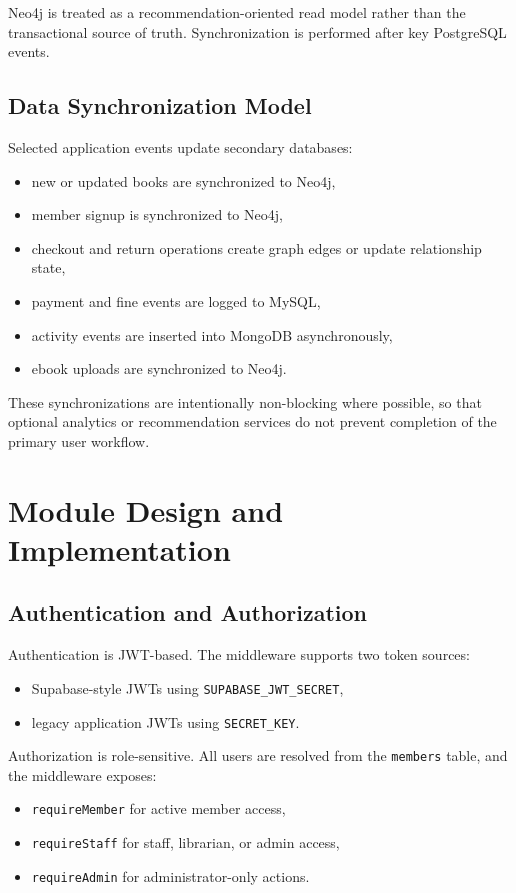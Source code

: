 \documentclass[12pt,a4paper]{report}
\begin{document}
Neo4j is treated as a recommendation-oriented read model rather than the transactional source of truth. Synchronization is performed after key PostgreSQL events.

\section{Data Synchronization Model}
Selected application events update secondary databases:
\begin{itemize}[leftmargin=1.5em]
    \item new or updated books are synchronized to Neo4j,
    \item member signup is synchronized to Neo4j,
    \item checkout and return operations create graph edges or update relationship state,
    \item payment and fine events are logged to MySQL,
    \item activity events are inserted into MongoDB asynchronously,
    \item ebook uploads are synchronized to Neo4j.
\end{itemize}

These synchronizations are intentionally non-blocking where possible, so that optional analytics or recommendation services do not prevent completion of the primary user workflow.

\chapter{Module Design and Implementation}
\section{Authentication and Authorization}
Authentication is JWT-based. The middleware supports two token sources:
\begin{itemize}[leftmargin=1.5em]
    \item Supabase-style JWTs using \texttt{SUPABASE\_JWT\_SECRET},
    \item legacy application JWTs using \texttt{SECRET\_KEY}.
\end{itemize}

Authorization is role-sensitive. All users are resolved from the \texttt{members} table, and the middleware exposes:
\begin{itemize}[leftmargin=1.5em]
    \item \texttt{requireMember} for active member access,
    \item \texttt{requireStaff} for staff, librarian, or admin access,
    \item \texttt{requireAdmin} for administrator-only actions.
\end{itemize}
\end{document}
